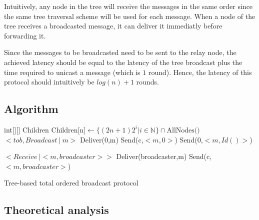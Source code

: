\documentclass[a4paper]{article}
\begin{document}
Intuitively, any node in the tree will receive the messages in the same order
since the same tree traversal scheme will be used for each message. When a
node of the tree receives a broadcasted message, it can deliver it immediatly
before forwarding it.

Since the messages to be broadcasted need to be sent to the relay node, the
achieved latency should be equal to the latency of the tree broadcast plus
the time required to unicast a message (which is $1$ round). Hence, the
latency of this protocol should intuitively be $log(n) + 1$ rounds.

\subsection{Algorithm}
\begin{algorithm}[H]
    \centering
    \begin{algorithmic}[5]
        \Data
        \State int[][] Children
        \EndData
        \Init
        \State Children[n]$\gets\{(2n + 1)2^i | i \in \mathbb{N}\} \cap \text{AllNodes()}$
        \EndFor
        \EndInit
        \Event $< tob,Broadcast\ |\ m> $
        \State Deliver(0,m)
        \State Send(c,$<m,0>$)
        \EndFor
        \Else
        \State Send(0,$<m,Id()>$)
        \EndIf
        \EndEvent

        \Event $<Receive\ | <m,broadcaster>>$
        \State Deliver(broadcaster,m)
        \State Send(c,$<m,broadcaster>$)
        \EndFor
        \EndEvent
    \end{algorithmic}
    \caption{Tree-based total ordered broadcast protocol}
\end{algorithm}

\subsection{Theoretical analysis}
\end{document}
